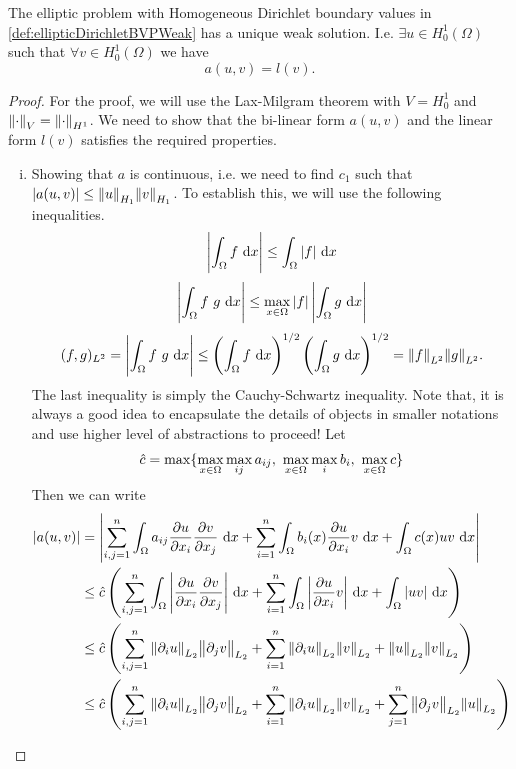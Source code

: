 \begin{theorem}
	The elliptic problem with Homogeneous Dirichlet boundary values in \autoref{def:ellipticDirichletBVPWeak} has a unique weak solution. I.e. $ \exists u \in H_0^1(\Omega)  $ such that $ \forall v \in H_0^1(\Omega) $ we have
	\[ a(u,v) = l(v). \] 
\end{theorem}
\begin{proof}
	For the proof, we will use the Lax-Milgram theorem with $ V = H_0^1 $ and $ \norm{\cdot}_V = \norm{\cdot}_{H^1} $. We need to show that the bi-linear form $ a(u,v) $ and the linear form $ l(v) $ satisfies the required properties. 
	\begin{enumerate}[(i)]
		\item Showing that $ a $ is continuous, i.e. we need to find $ c_1 $ such that $ |a(u,v) | \leq \norm{u}_{H_1} \norm{v}_{H_1}  $. To establish this, we will use the following inequalities. 
		\[ \left| \int_\Omega f \, \operatorname{d}\!x  \right| \leq \int_\Omega |f| \, \operatorname{d}\!x\]
		\[ \left| \int_\Omega f\ g\, \operatorname{d}\!x \right| \leq \max_{x\in\Omega}{|f|}\left| \int_\Omega g\, \operatorname{d}\!x \right| \]
		\[  (f,g)_{L^2} = \left| \int_\Omega f\ g \, \operatorname{d}\!x \right| \leq \left(\int_\Omega f\, \operatorname{d}\!x\right)^{1/2} \left(\int_\Omega g\, \operatorname{d}\!x\right)^{1/2} = \norm{f}_{L^2} \norm{g}_{L^2}. \]
		The last inequality is simply the Cauchy-Schwartz inequality. Note that, it is always a good idea to encapsulate the details of objects in smaller notations and use higher level of abstractions to proceed! Let 
		\[ \hat{c} = \max\{\max_{x\in \Omega}\max_{ij} a_{ij},\ \max_{x\in \Omega}\max_{i} b_i,\  \max_{x\in \Omega} c\} \]
		Then we can write
		\begin{align*}
			|a(u,v)| &= \left| \sum_{i,j=1}^{n}\int_\Omega a_{ij}\frac{\partial u}{\partial x_i} \frac{\partial v}{\partial x_j}\, \operatorname{d}\!x +\sum_{i=1}^{n} \int_\Omega b_i(x) \frac{\partial u}{\partial x_i} v\, \operatorname{d}\!x + \int_\Omega c(x) u v\, \operatorname{d}\!x \right|\\
			&\leq \hat{c} \left(
			\sum_{i,j=1}^{n}\int_\Omega \left| \frac{\partial u}{\partial x_i} \frac{\partial v}{\partial x_j} \right|\, \operatorname{d}\!x
			+ \sum_{i=1}^{n} \int_\Omega  \left| \frac{\partial u}{\partial x_i} v \right|\, \operatorname{d}\!x 
			+ \int_\Omega  \left| u v \right|\, \operatorname{d}\!x
			\right)\\
			&\leq \hat{c}\left(
			\sum_{i,j=1}^{n}\norm{\partial_i u}_{L_2}\norm{\partial_j v}_{L_2}
			+ \sum_{i=1}^{n} \norm{\partial_i u}_{L_2} \norm{v}_{L_2}
			+ \norm{u}_{L_2}\norm{v}_{L_2}
			\right)\\
			&\leq \hat{c}\left(
				\sum_{i,j=1}^{n}\norm{\partial_i u}_{L_2}\norm{\partial_j v}_{L_2}
				+ \sum_{i=1}^{n} \norm{\partial_i u}_{L_2} \norm{v}_{L_2}
				+ \sum_{j=1}^{n} \norm{\partial_j v}_{L_2} \norm{u}_{L_2}
\right)
\end{align*}
\end{enumerate}
\end{proof}
